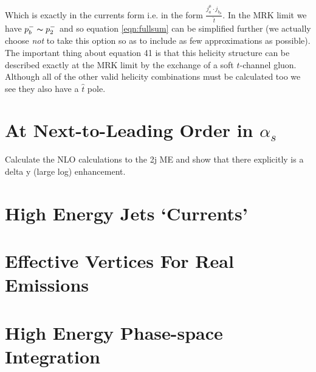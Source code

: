 			Which is exactly in the currents form i.e. in the form $\frac{j_a^\mu\cdot j_{b_\mu}}{\hat{t}}$.  In the MRK
			limit we have $p_b^-\thicksim p_2^-$ and so equation \ref{eqn:fullsum} can be simplified further (we actually
			choose \emph{not} to take this option so as to include as few approximations as possible).  The important
			thing about equation 41 is that this helicity structure can be described exactly at the MRK limit by the
			exchange of a soft $t$-channel gluon.  Although all of the other valid helicity combinations must be
			calculated too we see they also have a $\hat t$ pole.

	\section{At Next-to-Leading Order in $\alpha_s$}
	\label{sub:HE22_NLO}

		Calculate the NLO calculations to the 2j ME and show that there explicitly is a delta y (large log) enhancement.

	\section{High Energy Jets `Currents'}
	\label{sub:currents}

	\section{Effective Vertices For Real Emissions}
	\label{sub:effective_vertices_for_real_emissions}

	\section{High Energy Phase-space Integration}
	\label{sub:HEPhaseSpace}

